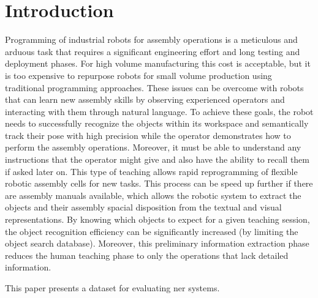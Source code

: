 \section{Introduction}\label{sec:introduction}

Programming of industrial robots for assembly operations is a meticulous and arduous task that requires a significant engineering effort and long testing and deployment phases. For high volume manufacturing this cost is acceptable, but it is too expensive to repurpose robots for small volume production using traditional programming approaches. These issues can be overcome with robots that can learn new assembly skills by observing experienced operators and interacting with them through natural language. To achieve these goals, the robot needs to successfully recognize the objects within its workspace and semantically track their pose with high precision while the operator demonstrates how to perform the assembly operations. Moreover, it must be able to understand any instructions that the operator might give and also have the ability to recall them if asked later on. This type of teaching allows rapid reprogramming of flexible robotic assembly cells for new tasks. This process can be speed up further if there are assembly manuals available, which allows the robotic system to extract the objects and their assembly spacial disposition from the textual and visual representations. By knowing which objects to expect for a given teaching session, the object recognition efficiency can be significantly increased (by limiting the object search database). Moreover, this preliminary information extraction phase reduces the human teaching phase to only the operations that lack detailed information.

This paper presents a dataset for evaluating \gls{ner} systems.
